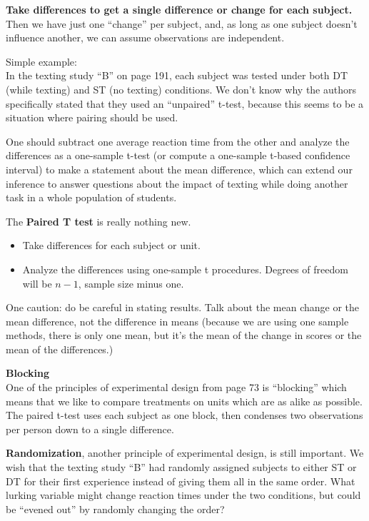 {\bf Take differences to get a single difference or change for each
  subject.} Then we have just one ``change'' per subject, and, as long
as one subject doesn't influence another, we can assume observations
are independent.  


Simple example:\\
  In the texting study ``B'' on page 191, each subject was tested
  under both DT (while texting) and ST (no texting) conditions.  We
  don't know why the authors specifically stated that they used an
  ``unpaired'' t-test, because this seems to be a situation where
  pairing should be used.  

  One should subtract one average reaction time from the other and
  analyze the differences as a one-sample t-test (or compute a
  one-sample t-based confidence interval) to make a statement about
  the mean difference, which can extend our inference to answer
  questions about the impact of texting while doing another task in a
  whole population of students.\vspace{.4cm}

The {\bf Paired T test} is really nothing new. 
\begin{itemize}
\item Take differences for each subject or unit.
\item Analyze the differences using one-sample t procedures. Degrees
  of freedom will be $n-1$, sample size minus one.
\end{itemize}
One caution: do be careful in stating results. 
Talk about the mean change or the mean difference, not the difference
in means (because we are using one sample methods, there is only one
mean, but it's the mean of the change in scores or the mean of the differences.)


{\bf Blocking}\\
  One of the principles of experimental design from page 73 is
  ``blocking'' which means that we like to compare treatments on units
  which are as alike as possible.  The paired t-test uses each subject
  as one block, then condenses two observations per person down to a
  single difference.
 
{\bf Randomization}, another principle of experimental design, is
still important.  We wish that the texting study ``B'' had randomly
assigned  subjects to either ST or DT for their first experience
 instead of giving them all in the same order.  What lurking
variable  might change reaction times under the two conditions, but
could be ``evened out'' by randomly changing the order?\vspace{1cm}

